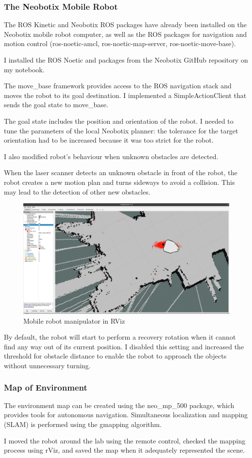 \subsubsection{The Neobotix Mobile Robot}
The ROS Kinetic and Neobotix ROS packages have already been installed on the Neobotix mobile robot computer, as well as the ROS packages for navigation and motion control (ros-noetic-amcl, ros-noetic-map-server, ros-noetic-move-base).\par
I installed the ROS Noetic and packages from the Neobotix GitHub repository on my notebook. \par
The move\_base framework provides access to the ROS navigation stack and moves the robot to its goal destination. I implemented a SimpleActionClient that sends the goal state to move\_base.\par
The goal state includes the position and orientation of the robot. I needed to tune the parameters of the local Neobotix planner: the tolerance for the target orientation had to be increased because it was too strict for the robot.\par
I also modified robot's behaviour when unknown obstacles are detected. \par 
When the laser scanner detects an unknown obstacle in front of the robot, the robot creates a new motion plan and turns sideways to avoid a collision. This may lead to the detection of other new obstacles.\par

\begin{figure}[h]
    \centering
    \includegraphics[width=0.5\linewidth]{rViz_navigation.png}
    \caption{Mobile robot manipulator in RViz}
    \label{fig:enter-label}
\end{figure}

By default, the robot will start to perform a recovery rotation when it cannot find any way out of its current position. I disabled this setting and increased the threshold for obstacle distance to enable the robot to approach the objects without unnecessary turning.\par

\subsubsection{Map of Environment}
The environment map can be created using the neo\_mp\_500 package, which provides tools for autonomous navigation. Simultaneous localization and mapping (SLAM) is performed using the gmapping algorithm.\par
I moved the robot around the lab using the remote control, checked the mapping process using rViz, and saved the map when it adequately represented the scene.\par

